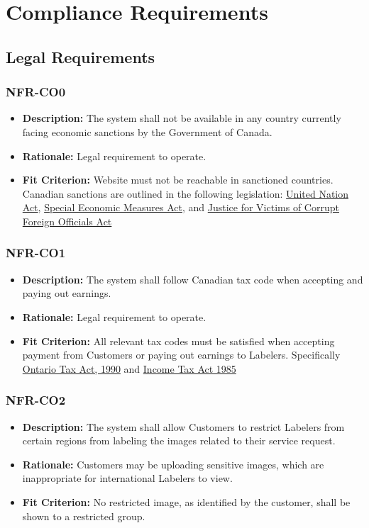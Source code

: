 \documentclass[12pt]{article}
\begin{document}
\section{Compliance Requirements}
\subsection{Legal Requirements}
\subsubsection*{NFR-CO0}
\label{sec:CO0}
\begin{itemize}
  \item \textbf{Description:} The system shall not be available in any country currently facing economic sanctions by the Government of Canada.
  \item \textbf{Rationale:} Legal requirement to operate.
  \item \textbf{Fit Criterion:} Website must not be reachable in sanctioned countries. Canadian sanctions are outlined in the following legislation: \href{http://laws-lois.justice.gc.ca/eng/acts/U-2/index.html}{United Nation Act}, \href{http://laws-lois.justice.gc.ca/eng/acts/S-14.5/index.html}{Special Economic Measures Act}, and \href{http://laws.justice.gc.ca/eng/acts/J-2.3/}{Justice for Victims of Corrupt Foreign Officials Act}
\end{itemize}
\subsubsection*{NFR-CO1}
\label{sec:CO1}
\begin{itemize}
  \item \textbf{Description:} The system shall follow Canadian tax code when accepting and paying out earnings.
  \item \textbf{Rationale:} Legal requirement to operate.
  \item \textbf{Fit Criterion:} All relevant tax codes must be satisfied when accepting payment from Customers or paying out earnings to Labelers. Specifically \href{https://www.ontario.ca/laws/statute/90c40}{Ontario Tax Act, 1990} and \href{https://laws-lois.justice.gc.ca/eng/acts/i-3.3/}{Income Tax Act 1985}
\end{itemize}
\subsubsection*{NFR-CO2}
\label{sec:CO2}
\begin{itemize}
  \item \textbf{Description:} The system shall allow Customers to restrict Labelers from certain regions from labeling the images related to their service request.
  \item \textbf{Rationale:} Customers may be uploading sensitive images, which are inappropriate for international Labelers to view.
  \item \textbf{Fit Criterion:} No restricted image, as identified by the customer, shall be shown to a restricted group.
\end{itemize}
\end{document}
